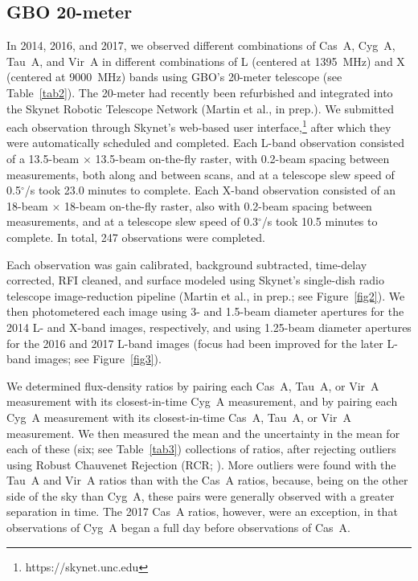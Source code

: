 \documentclass[fleqn,usenatbib]{mnras}
\begin{document}
\subsection{GBO 20-meter}\label{gbo20data}

In 2014, 2016, and 2017, we observed different combinations of Cas~A, Cyg~A, Tau~A, and Vir~A in different combinations of L (centered at 1395~MHz) and X (centered at 9000~MHz) bands using GBO's 20-meter telescope (see Table~\ref{tab2}).  The 20-meter had recently been refurbished and integrated into the Skynet Robotic Telescope Network (Martin et al., in prep.).  We submitted each observation through Skynet's web-based user interface,\footnote{https://skynet.unc.edu} after which they were automatically scheduled and completed.  Each L-band observation consisted of a 13.5-beam $\times$ 13.5-beam on-the-fly raster, with 0.2-beam spacing between measurements, both along and between scans, and at a telescope slew speed of 0.5$^\circ$/s took 23.0 minutes to complete.  Each X-band observation consisted of an 18-beam $\times$ 18-beam on-the-fly raster, also with 0.2-beam spacing between measurements, and at a telescope slew speed of 0.3$^\circ$/s took 10.5 minutes to complete.  In total, 247 observations were completed.



Each observation was gain calibrated, background subtracted, time-delay corrected, RFI cleaned, and surface modeled using Skynet's single-dish radio telescope image-reduction pipeline (Martin et al., in prep.; see Figure~\ref{fig2}).  We then photometered each image using 3- and 1.5-beam diameter apertures for the 2014 L- and X-band images, respectively, and using 1.25-beam diameter apertures for the 2016 and 2017 L-band images (focus had been improved for the later L-band images; see Figure~\ref{fig3}).

We determined flux-density ratios by pairing each Cas~A, Tau~A, or Vir~A measurement with its closest-in-time Cyg~A measurement, and by pairing each Cyg~A measurement with its closest-in-time Cas~A, Tau~A, or Vir~A measurement.  We then measured the mean and the uncertainty in the mean for each of these (six; see Table~\ref{tab3}) collections of ratios, after rejecting outliers using Robust Chauvenet Rejection (RCR; \citealt{m17}).  More outliers were found with the Tau~A and Vir~A ratios than with the Cas~A ratios, because, being on the other side of the sky than Cyg~A, these pairs were generally observed with a greater separation in time.  The 2017 Cas~A ratios, however, were an exception, in that observations of Cyg~A began a full day before observations of Cas~A.
\end{document}
